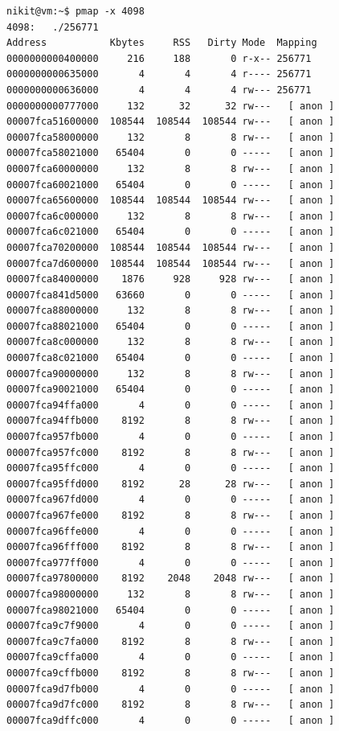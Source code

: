 \documentclass[11pt, a4paper]{article}
\begin{document}
\begin{Verbatim}[fontsize=\small]
nikit@vm:~$ pmap -x 4098
4098:   ./256771
Address           Kbytes     RSS   Dirty Mode  Mapping
0000000000400000     216     188       0 r-x-- 256771
0000000000635000       4       4       4 r---- 256771
0000000000636000       4       4       4 rw--- 256771
0000000000777000     132      32      32 rw---   [ anon ]
00007fca51600000  108544  108544  108544 rw---   [ anon ]
00007fca58000000     132       8       8 rw---   [ anon ]
00007fca58021000   65404       0       0 -----   [ anon ]
00007fca60000000     132       8       8 rw---   [ anon ]
00007fca60021000   65404       0       0 -----   [ anon ]
00007fca65600000  108544  108544  108544 rw---   [ anon ]
00007fca6c000000     132       8       8 rw---   [ anon ]
00007fca6c021000   65404       0       0 -----   [ anon ]
00007fca70200000  108544  108544  108544 rw---   [ anon ]
00007fca7d600000  108544  108544  108544 rw---   [ anon ]
00007fca84000000    1876     928     928 rw---   [ anon ]
00007fca841d5000   63660       0       0 -----   [ anon ]
00007fca88000000     132       8       8 rw---   [ anon ]
00007fca88021000   65404       0       0 -----   [ anon ]
00007fca8c000000     132       8       8 rw---   [ anon ]
00007fca8c021000   65404       0       0 -----   [ anon ]
00007fca90000000     132       8       8 rw---   [ anon ]
00007fca90021000   65404       0       0 -----   [ anon ]
00007fca94ffa000       4       0       0 -----   [ anon ]
00007fca94ffb000    8192       8       8 rw---   [ anon ]
00007fca957fb000       4       0       0 -----   [ anon ]
00007fca957fc000    8192       8       8 rw---   [ anon ]
00007fca95ffc000       4       0       0 -----   [ anon ]
00007fca95ffd000    8192      28      28 rw---   [ anon ]
00007fca967fd000       4       0       0 -----   [ anon ]
00007fca967fe000    8192       8       8 rw---   [ anon ]
00007fca96ffe000       4       0       0 -----   [ anon ]
00007fca96fff000    8192       8       8 rw---   [ anon ]
00007fca977ff000       4       0       0 -----   [ anon ]
00007fca97800000    8192    2048    2048 rw---   [ anon ]
00007fca98000000     132       8       8 rw---   [ anon ]
00007fca98021000   65404       0       0 -----   [ anon ]
00007fca9c7f9000       4       0       0 -----   [ anon ]
00007fca9c7fa000    8192       8       8 rw---   [ anon ]
00007fca9cffa000       4       0       0 -----   [ anon ]
00007fca9cffb000    8192       8       8 rw---   [ anon ]
00007fca9d7fb000       4       0       0 -----   [ anon ]
00007fca9d7fc000    8192       8       8 rw---   [ anon ]
00007fca9dffc000       4       0       0 -----   [ anon ]

\end{Verbatim}
\end{document}
